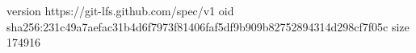 version https://git-lfs.github.com/spec/v1
oid sha256:231c49a7aefac31b4d6f7973f81406faf5df9b909b82752894314d298cf7f05c
size 174916
